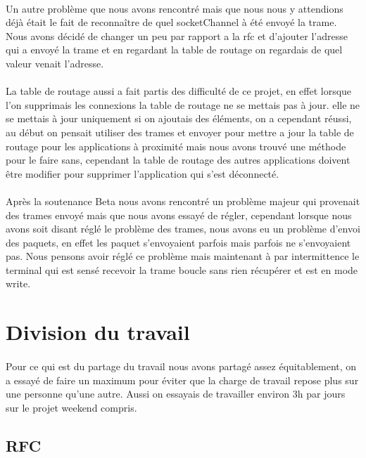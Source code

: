 \documentclass[a4paper,titlepage]{report}
\begin{document}
\paragraph{}
Un autre problème que nous avons rencontré mais que nous nous y attendions déjà était le fait de reconnaître de quel socketChannel à été envoyé la trame.
Nous avons décidé de changer un peu par rapport a la rfc et d'ajouter l'adresse qui a envoyé la trame et en regardant la table de routage on regardais de quel valeur venait l'adresse.
\paragraph{}
La table de routage aussi a fait partis des difficulté de ce projet, en effet lorsque l'on supprimais les connexions la table de routage ne se mettais pas à jour. elle ne se mettais à jour uniquement si on ajoutais des éléments, on a cependant réussi, au début on pensait utiliser des trames et envoyer pour mettre a jour la table de routage pour les applications à proximité mais nous avons trouvé une méthode pour le faire sans, cependant la table de routage des autres applications doivent être modifier pour supprimer l'application qui s'est déconnecté.
\paragraph{}
Après la soutenance Beta nous avons rencontré un problème majeur qui provenait des trames envoyé mais que nous avons essayé de régler, cependant lorsque nous avons soit disant réglé le problème des trames, nous avons eu un problème d'envoi des paquets, en effet les paquet s'envoyaient parfois mais parfois ne s'envoyaient pas.
\linebreak
Nous pensons avoir réglé ce problème mais maintenant à par intermittence le terminal qui est sensé recevoir la trame boucle sans rien récupérer et est en mode write.
\section{Division du travail}
\paragraph{}
Pour ce qui est du partage du travail nous avons partagé assez équitablement, on a essayé de faire un maximum pour éviter que la charge de travail repose plus sur une personne qu'une autre. Aussi on essayais de travailler environ 3h par jours sur le projet weekend compris.
\subsection{RFC}
\end{document}
